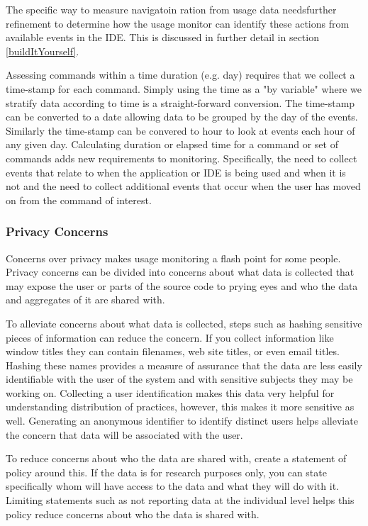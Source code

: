 The specific way to measure navigatoin ration from usage data needsfurther refinement to determine how the usage monitor can identify these actions from available events in the IDE. This is discussed in further detail in section \ref{buildItYourself}.

Assessing commands within a time duration (e.g. day) requires that we collect a time-stamp for each command.  Simply using the time as a "by variable" where we stratify data according to time is a straight-forward conversion.  The time-stamp can be converted to a date allowing data to be grouped by the day of the events.  Similarly the time-stamp can be convered to hour to look at events each hour of any given day.
Calculating duration or elapsed time for a command or set of commands adds new requirements to monitoring.  Specifically, the need to collect events that relate to when the application or IDE is being used and when it is not and the need to collect additional events that occur when the user has moved on from the command of interest.  


\subsubsection{Privacy Concerns}

Concerns over privacy makes usage monitoring a flash point for some people.  Privacy concerns can be divided into concerns about what data is collected that may expose the user or parts of the source code to prying eyes and who the data and aggregates of it are shared with.

To alleviate concerns about what data is collected, steps such as hashing sensitive pieces of information can reduce the concern. If you collect information like window titles they can contain filenames, web site titles, or even email titles.  Hashing these names provides a measure of assurance that the data are less easily identifiable with the user of the system and with sensitive subjects they may be working on.   Collecting a user identification makes this data very helpful for understanding distribution of practices, however, this makes it more sensitive as well.  Generating an anonymous identifier to identify distinct users helps alleviate the concern that data will be associated with the user.

To reduce concerns about who the data are shared with, create a statement of policy around this.  If the data is for research purposes only, you can state specifically whom will have access to the data and what they will do with it.  Limiting statements such as not reporting data at the individual level helps this policy reduce concerns about who the data is shared with.


